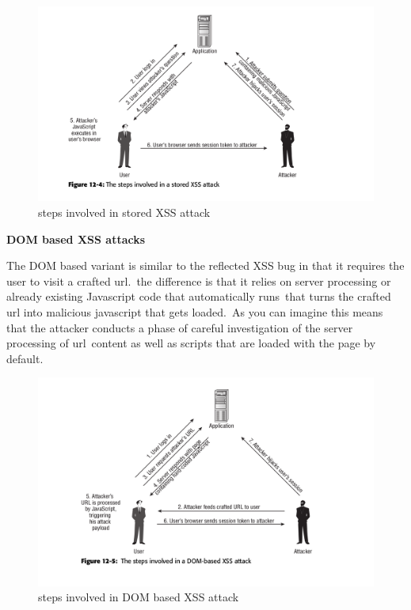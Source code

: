 \documentclass[a4paper,12pt]{paper}
\begin{document}
\begin{figure}
\centering
\includegraphics[width=1\textwidth]{stored-XSS.png}
\caption{\label{fig:xsssto}steps involved in stored XSS attack}
\end{figure}

\textbf{DOM based XSS attacks}

The DOM based variant is similar to the reflected XSS bug in that it requires the user to visit a crafted url.\
the difference is that it relies on server processing or already existing Javascript code that automatically runs\
that turns the crafted url into malicious javascript that gets loaded.\
As you can imagine this means that the attacker conducts a phase of careful investigation of the server processing of url\
content as well as scripts that are loaded with the page by default.\\

\begin{figure}
\centering
\includegraphics[width=1\textwidth]{DOM-XSS.png}
\caption{\label{fig:xssdom}steps involved in DOM based XSS attack}
\end{figure}
\end{document}
